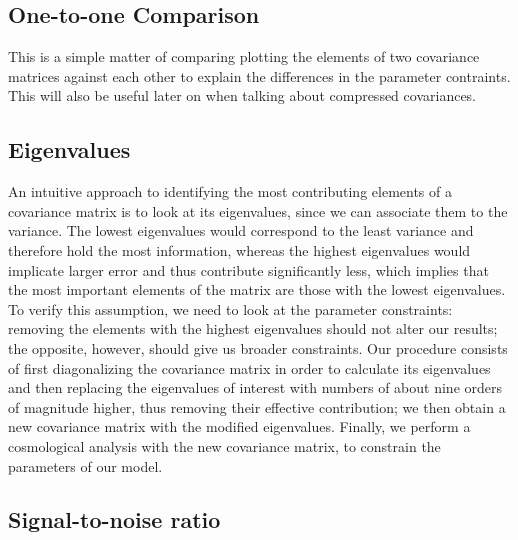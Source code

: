 \documentclass[twocolumn]{\docclass}
\begin{document}
	\subsection{One-to-one Comparison}
	
	This is a simple matter of comparing plotting the elements of two covariance matrices against each other to explain the differences in the parameter contraints. This will also be useful later on when talking about compressed covariances.
	
	
	\subsection{Eigenvalues}
	
	An intuitive approach to identifying the most contributing elements of a covariance matrix is to look at its eigenvalues, since we can associate them to the variance. The lowest eigenvalues would correspond to the least variance and therefore hold the most information, whereas the highest eigenvalues would implicate larger error and thus contribute significantly less, which implies that the most important elements of the matrix are those with the lowest eigenvalues. To verify this assumption, we need to look at the parameter constraints: removing the elements with the highest eigenvalues should not alter our results; the opposite, however, should give us broader constraints. Our procedure consists of first diagonalizing the covariance matrix in order to calculate its eigenvalues and then replacing the eigenvalues of interest with numbers of about nine orders of magnitude higher, thus removing their effective contribution; we then obtain a new covariance matrix with the modified eigenvalues. Finally, we perform a cosmological analysis with the new covariance matrix, to constrain the parameters of our model. 
	
	
	\subsection{Signal-to-noise ratio}
	
\end{document}
